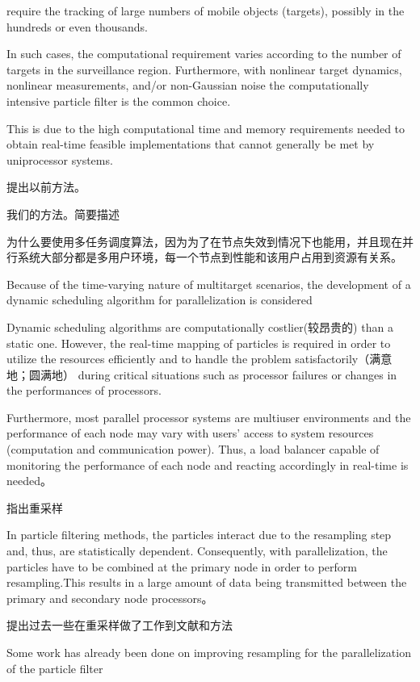 \documentclass[a4paper, 11pt]{article}
\begin{document}
\begin{CJK}{UTF8}{gbsn}
   require the tracking of large numbers
of mobile objects (targets), possibly in the hundreds
or even thousands.
  
  
  In such cases, the computational requirement varies according to the number of targets in the surveillance region. Furthermore, with nonlinear
target dynamics, nonlinear measurements, and/or
non-Gaussian noise the computationally intensive
particle filter is the common choice.


This is due to the
high computational time and memory requirements
needed to obtain real-time feasible implementations
that cannot generally be met by uniprocessor systems.


提出以前方法。


我们的方法。简要描述 

为什么要使用多任务调度算法，因为为了在节点失效到情况下也能用，并且现在并行系统大部分都是多用户环境，每一个节点到性能和该用户占用到资源有关系。


Because of the time-varying nature of multitarget
scenarios, the development of a dynamic scheduling
algorithm for parallelization is considered

 Dynamic scheduling algorithms are computationally costlier(较昂贵的)
than a static one. However, the real-time mapping of
particles is required in order to utilize the resources
efficiently and to handle the problem satisfactorily（满意地；圆满地）
during critical situations such as processor failures or
changes in the performances of processors.

Furthermore, most parallel processor systems are
multiuser environments and the performance of each
node may vary with users’ access to system resources
(computation and communication power). Thus, a load
balancer capable of monitoring the performance of
each node and reacting accordingly in real-time is
needed。

指出重采样


In particle filtering methods, the particles interact due to
the resampling step   and, thus, are statistically
dependent. Consequently, with parallelization, the
particles have to be combined at the primary node in
order to perform resampling.This results in a large
amount of data being transmitted between the primary
and secondary node processors。

提出过去一些在重采样做了工作到文献和方法

Some work has already been done on improving
resampling for the parallelization of the particle filter


\end{CJK}
\end{document}
